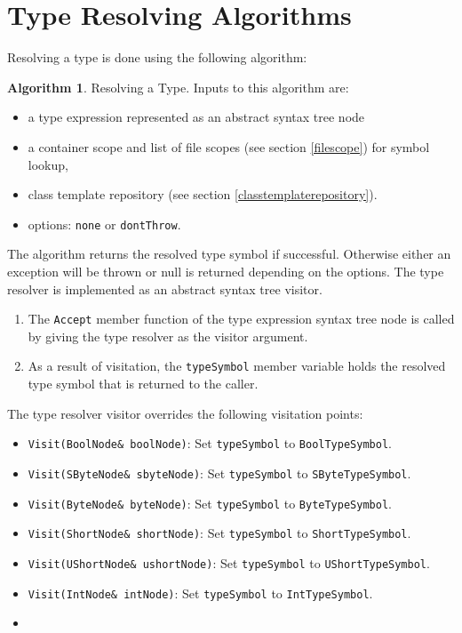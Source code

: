\documentclass[a4paper,oneside,11pt]{book}
\theoremstyle{definition}
\newtheorem{algo}{Algorithm}[section]
\begin{document}
\clearpage
\section{Type Resolving Algorithms}
Resolving a type is done using the following algorithm:

\begin{algo}\label{resolvingtype} Resolving a Type. Inputs to this algorithm are:
\begin{itemize}
\item
a type expression represented as an abstract syntax tree node
\item
a container scope and list of file scopes (see section \ref{filescope}) for symbol lookup,
\item
class template repository (see section \ref{classtemplaterepository}).
\item
options: \verb|none| or \verb|dontThrow|.
\end{itemize}
The algorithm returns the resolved type symbol if successful. Otherwise either an exception will be thrown or null is returned depending on the options.
The type resolver is implemented as an abstract syntax tree visitor.
\begin{enumerate}
\item
The \verb|Accept| member function of the type expression syntax tree node is called by giving the type resolver as the visitor argument.
\item
As a result of visitation, the \verb|typeSymbol| member variable holds the resolved type symbol that is returned to the caller.
\end{enumerate}
The type resolver visitor overrides the following visitation points:
\begin{itemize}
\item
\verb|Visit(BoolNode& boolNode)|:
Set \verb|typeSymbol| to \verb|BoolTypeSymbol|.
\item
\verb|Visit(SByteNode& sbyteNode)|:
Set \verb|typeSymbol| to \verb|SByteTypeSymbol|.
\item
\verb|Visit(ByteNode& byteNode)|:
Set \verb|typeSymbol| to \verb|ByteTypeSymbol|.
\item
\verb|Visit(ShortNode& shortNode)|:
Set \verb|typeSymbol| to \verb|ShortTypeSymbol|.
\item
\verb|Visit(UShortNode& ushortNode)|:
Set \verb|typeSymbol| to \verb|UShortTypeSymbol|.
\item
\verb|Visit(IntNode& intNode)|:
Set \verb|typeSymbol| to \verb|IntTypeSymbol|.
\item

\end{itemize}
\end{algo}
\end{document}
